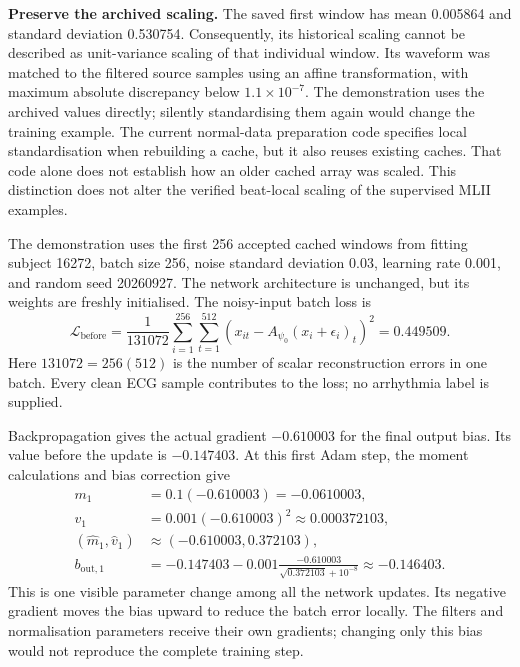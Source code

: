 \textbf{Preserve the archived scaling.} The saved first window has mean
0.005864 and standard deviation 0.530754. Consequently, its historical
scaling cannot be described as unit-variance scaling of that individual
window. Its waveform was matched to the filtered source samples using an
affine transformation, with maximum absolute discrepancy below
$1.1\times10^{-7}$. The demonstration uses the archived values directly;
silently standardising them again would change the training example. The
current normal-data preparation code specifies local standardisation when
rebuilding a cache, but it also reuses existing caches. That code alone does
not establish how an older cached array was scaled. This distinction does
not alter the verified beat-local scaling of the supervised MLII examples.

The demonstration uses the first 256 accepted cached windows from fitting
subject 16272, batch size 256, noise standard deviation 0.03, learning rate
0.001, and random seed 20260927. The network architecture is unchanged, but
its weights are freshly initialised. The noisy-input batch loss is
\begin{equation}
 \mathcal{L}_{\mathrm{before}}=
 \frac{1}{131072}\sum_{i=1}^{256}\sum_{t=1}^{512}
 (x_{it}-A_{\psi_0}(x_i+\epsilon_i)_t)^2
 =0.449509.
 \label{eq:real-ae-batch-loss}
\end{equation}
Here $131072=256(512)$ is the number of scalar reconstruction errors in
one batch. Every clean ECG sample contributes to the loss; no arrhythmia
label is supplied.

Backpropagation gives the actual gradient $-0.610003$ for the final output
bias. Its value before the update is $-0.147403$. At this first Adam step,
the moment calculations and bias correction give
\begin{align}
 m_1&=0.1(-0.610003)=-0.0610003,\\
 v_1&=0.001(-0.610003)^2\approx0.000372103,\\
 (\widehat m_1,\widehat v_1)&\approx(-0.610003,0.372103),\\
 b_{\mathrm{out},1}
 &=-0.147403-0.001\frac{-0.610003}{\sqrt{0.372103}+10^{-8}}
 \approx-0.146403.
 \label{eq:real-ae-bias-update}
\end{align}
This is one visible parameter change among all the network updates. Its
negative gradient moves the bias upward to reduce the batch error locally.
The filters and normalisation parameters receive their own gradients;
changing only this bias would not reproduce the complete training step.

